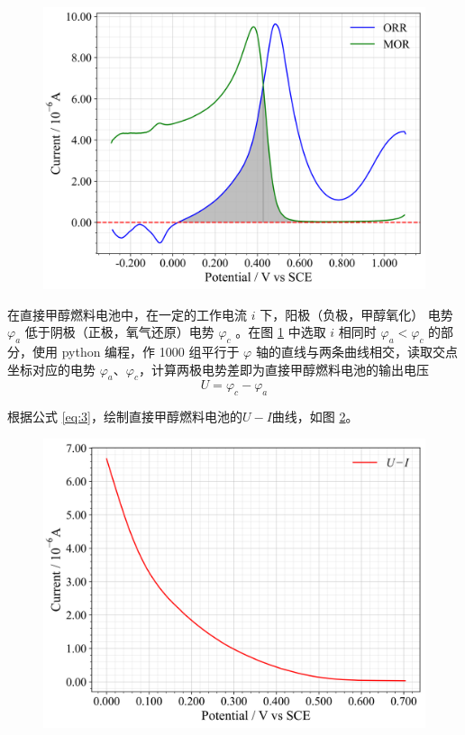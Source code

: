 \begin{figure}[htbp]
    \centering
    \includegraphics[width=.75\textwidth]{figures2/6.png}
    \label{fig:6}
\end{figure}

在直接甲醇燃料电池中，在一定的工作电流 $i$ 下，阳极（负极，甲醇氧化） 电势 $\varphi_a$ 低于阴极（正极，氧气还原）电势 $\varphi_c$ 。在图 \ref{fig:6} 中选取 $i$ 相同时 $\varphi_a<\varphi_c$ 的部分，使用 python 编程，作 1000 组平行于 $\varphi$ 轴的直线与两条曲线相交，读取交点坐标对应的电势 $\varphi_a $、$ \varphi_c$，计算两极电势差即为直接甲醇燃料电池的输出电压
\begin{equation}\label{eq:3}
    U=\varphi_c-\varphi_a
\end{equation}

根据公式 \eqref{eq:3}，绘制直接甲醇燃料电池的$U-I$曲线，如图 \ref{fig:7}。

\begin{figure}[htbp]
    \centering
    \includegraphics[width=.75\textwidth]{figures2/7.png}
    \label{fig:7}
\end{figure}

